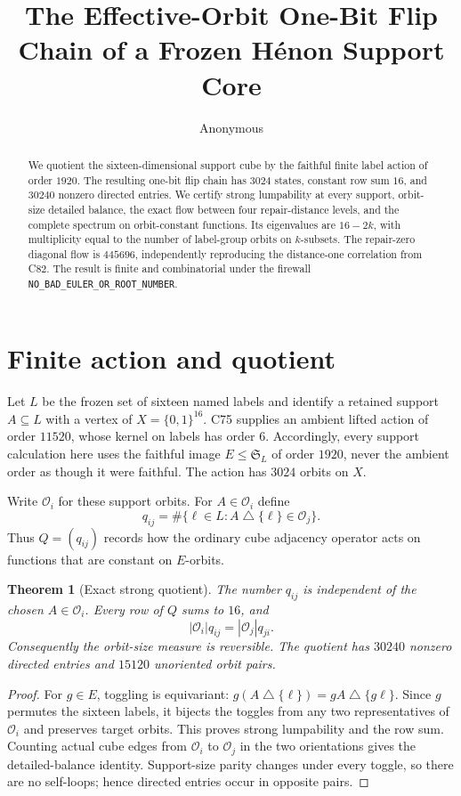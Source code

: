 \documentclass[10pt]{article}
\title{The Effective-Orbit One-Bit Flip Chain of a Frozen H\'enon Support Core}
\author{Anonymous}
\date{}
\newtheorem{theorem}{Theorem}
\newcommand{\cO}{\mathcal O}
\newcommand{\cube}{\{0,1\}^{16}}
\begin{document}
\maketitle

\begin{abstract}
We quotient the sixteen-dimensional support cube by the faithful finite label
action of order $1920$.  The resulting one-bit flip chain has $3024$ states,
constant row sum $16$, and $30240$ nonzero directed entries.  We certify
strong lumpability at every support, orbit-size detailed balance, the exact
flow between four repair-distance levels, and the complete spectrum on
orbit-constant functions.  Its eigenvalues are $16-2k$, with multiplicity
equal to the number of label-group orbits on $k$-subsets.  The repair-zero
diagonal flow is $445696$, independently reproducing the distance-one
correlation from C82.  The result is finite and combinatorial under the
firewall \texttt{NO\_BAD\_EULER\_OR\_ROOT\_NUMBER}.
\end{abstract}

\section{Finite action and quotient}
Let $L$ be the frozen set of sixteen named labels and identify a retained
support $A\subseteq L$ with a vertex of $X=\cube$.  C75 supplies an ambient
lifted action of order $11520$, whose kernel on labels has order $6$.
Accordingly, every support calculation here uses the faithful image
$E\leq\mathfrak S_L$ of order $1920$, never the ambient order as though it
were faithful.  The action has $3024$ orbits on $X$.

Write $\cO_i$ for these support orbits.  For $A\in\cO_i$ define
\[
 q_{ij}=\#\{\ell\in L:A\mathbin{\triangle}\{\ell\}\in\cO_j\}.
\]
Thus $Q=(q_{ij})$ records how the ordinary cube adjacency operator acts on
functions that are constant on $E$-orbits.

\begin{theorem}[Exact strong quotient]
The number $q_{ij}$ is independent of the chosen $A\in\cO_i$.  Every row of
$Q$ sums to $16$, and
\[
 |\cO_i|q_{ij}=|\cO_j|q_{ji}.
\]
Consequently the orbit-size measure is reversible.  The quotient has
$30240$ nonzero directed entries and $15120$ unoriented orbit pairs.
\end{theorem}
\begin{proof}
For $g\in E$, toggling is equivariant:
$g(A\mathbin{\triangle}\{\ell\})=gA\mathbin{\triangle}\{g\ell\}$.
Since $g$ permutes the sixteen labels, it bijects the toggles from any two
representatives of $\cO_i$ and preserves target orbits.  This proves strong
lumpability and the row sum.  Counting actual cube edges from $\cO_i$ to
$\cO_j$ in the two orientations gives the detailed-balance identity.
Support-size parity changes under every toggle, so there are no self-loops;
hence directed entries occur in opposite pairs.
\end{proof}
\end{document}
